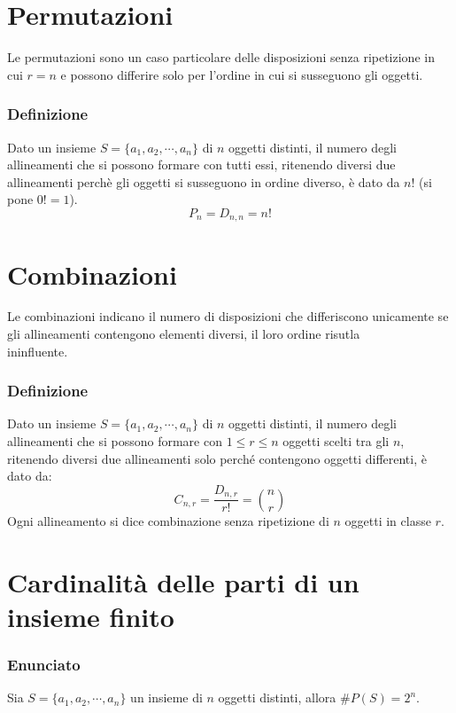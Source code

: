 \section{Permutazioni}
Le permutazioni sono un caso particolare delle disposizioni senza ripetizione in cui $r=n$ e possono differire solo per l'ordine in cui si susseguono gli 
oggetti.
\subsubsection{Definizione}
Dato un insieme $S=\{a_1,a_2,\cdots, a_n\}$ di $n$ oggetti distinti, il numero degli allineamenti che si possono formare con tutti essi, ritenendo diversi due 
allineamenti perchè gli oggetti si susseguono in ordine diverso, è dato da $n!$ (si pone $0! = 1$).
\begin{equation}
P_n=D_{n,n}=n!
\end{equation}
\section{Combinazioni}
Le combinazioni indicano il numero di disposizioni che differiscono unicamente se gli allineamenti contengono elementi diversi, il loro ordine risutla \\
ininfluente.
\subsubsection{Definizione}
Dato un insieme $S=\{a_1,a_2,\cdots, a_n\}$ di $n$ oggetti distinti, il numero degli allineamenti che si possono formare con $1\le r\le n$ oggetti scelti tra 
gli $n$, ritenendo diversi due allineamenti solo perché contengono oggetti differenti, \`e dato da:
\begin{equation}
C_{n,r}=\dfrac{D_{n,r}}{r!}=\binom{n}{r}
\end{equation}
Ogni allineamento si dice combinazione senza ripetizione di $n$ oggetti in classe $r$.
\section{Cardinalit\`a delle parti di un insieme finito}
\subsubsection{Enunciato}
Sia $S=\{a_1,a_2,\cdots, a_n\}$ un insieme di $n$ oggetti distinti, allora $\#P(S)=2^n$.
